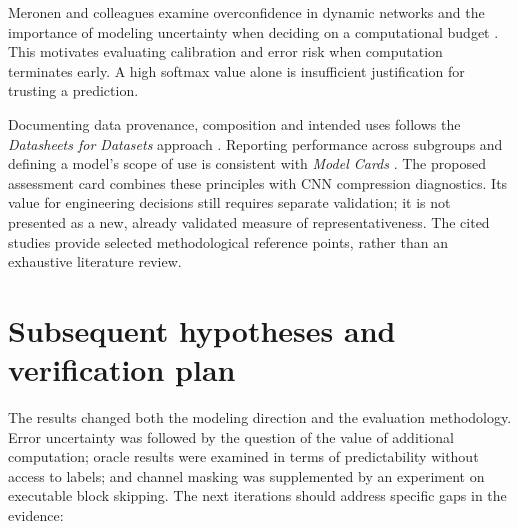 \documentclass[12pt,a4paper]{article}
\begin{document}
Meronen and colleagues examine overconfidence in dynamic networks
and the importance of modeling uncertainty when deciding on
a computational budget \cite{overconfidence}.
This motivates evaluating calibration and error risk when computation
terminates early. A high softmax value alone is insufficient justification
for trusting a prediction.

Documenting data provenance, composition and intended uses follows
the \emph{Datasheets for Datasets} approach \cite{datasheets}.
Reporting performance across subgroups and defining a model's scope
of use is consistent with \emph{Model Cards} \cite{modelcards}.
The proposed assessment card combines these principles with CNN
compression diagnostics.
Its value for engineering decisions still requires separate validation;
it is not presented as a new, already validated measure of representativeness.
The cited studies provide selected methodological reference points,
rather than an exhaustive literature review.

\section{Subsequent hypotheses and verification plan}

The results changed both the modeling direction and the evaluation
methodology.
Error uncertainty was followed by the question of the value of additional
computation; oracle results were examined in terms of predictability
without access to labels; and channel masking was supplemented by
an experiment on executable block skipping.
The next iterations should address specific gaps in the evidence:
\end{document}
